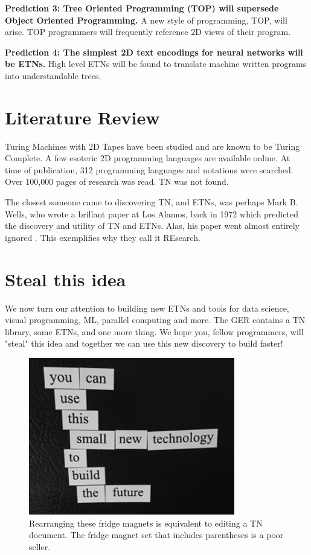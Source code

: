 \documentclass[journal]{IEEEtran}
\begin{document}
\textbf{Prediction 3: Tree Oriented Programming (TOP) will supersede Object Oriented Programming.} A new style of programming, TOP, will arise. TOP programmers will frequently reference 2D views of their program.

\textbf{Prediction 4: The simplest 2D text encodings for neural networks will be ETNs.} High level ETNs will be found to translate machine written programs into understandable trees.

\section{Literature Review}

Turing Machines with 2D Tapes have been studied and are known to be Turing Complete\cite{Toida}. A few esoteric 2D programming languages are available online\cite{Ender}. At time of publication, 312 programming languages and notations were searched. Over 100,000 pages of research was read. TN was not found.

The closest someone came to discovering TN, and ETNs, was perhaps Mark B. Wells, who wrote a brillant paper at Los Alamos, back in 1972 which predicted the discovery and utility of TN and ETNs. Alas, his paper went almost entirely ignored \cite{Wells}. This exemplifies why they call it REsearch.

\section{Steal this idea}

We now turn our attention to building new ETNs and tools for data science, visual programming, ML, parallel computing and more. The GER contains a TN library, some ETNs, and one more thing. We hope you, fellow programmers, will "steal" this idea and together we can use this new discovery to build faster!
\begin{figure}[ht!]
\centering
\includegraphics[width=90mm]{tree.jpg}
\caption{Rearranging these fridge magnets is equivalent to editing a TN document. The fridge magnet set that includes parentheses is a poor seller.}
\end{figure}
\end{document}
